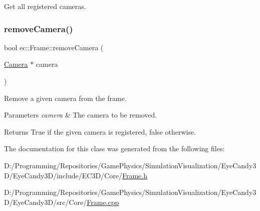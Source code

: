 Get all registered cameras. 

\mbox{\label{classec_1_1_frame_a7a93ec89a809f5b7e685c5adc73d6cda}} 
\subsubsection{\texorpdfstring{remove\+Camera()}{removeCamera()}}
{\footnotesize\ttfamily bool ec\+::\+Frame\+::remove\+Camera (\begin{DoxyParamCaption}\item[{\mbox{\hyperlink{classec_1_1_camera}{Camera}} $\ast$}]{camera }\end{DoxyParamCaption})}



Remove a given camera from the frame. 


\begin{DoxyParams}{Parameters}
{\em camera} & The camera to be removed. \\
\hline
\end{DoxyParams}
\begin{DoxyReturn}{Returns}
True if the given camera is registered, false otherwise. 
\end{DoxyReturn}


The documentation for this class was generated from the following files\+:\begin{DoxyCompactItemize}
\item 
D\+:/\+Programming/\+Repositories/\+Game\+Physics/\+Simulation\+Visualization/\+Eye\+Candy3\+D/\+Eye\+Candy3\+D/include/\+E\+C3\+D/\+Core/\mbox{\hyperlink{_frame_8h}{Frame.\+h}}\item 
D\+:/\+Programming/\+Repositories/\+Game\+Physics/\+Simulation\+Visualization/\+Eye\+Candy3\+D/\+Eye\+Candy3\+D/src/\+Core/\mbox{\hyperlink{_frame_8cpp}{Frame.\+cpp}}\end{DoxyCompactItemize}
